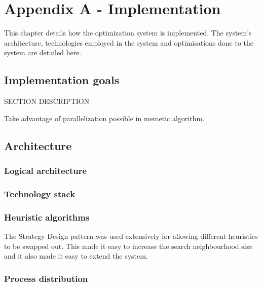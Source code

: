 
\chapter{Appendix A - Implementation}
This chapter details how the optimization system is implemented. The system's architecture, technologies employed in the system and optimisations done to the system are detailed here.

\section{Implementation goals}
SECTION DESCRIPTION

Take advantage of parallelization possible in memetic algorithm.

\section{Architecture}

\subsection{Logical architecture}


\subsection{Technology stack}

\subsection{Heuristic algorithms}

The Strategy Design pattern was used extensively for allowing different heuristics to be swapped out. This made it easy to increase the search neighbourhood size and it also made it easy to extend the system.


\subsection{Process distribution}


